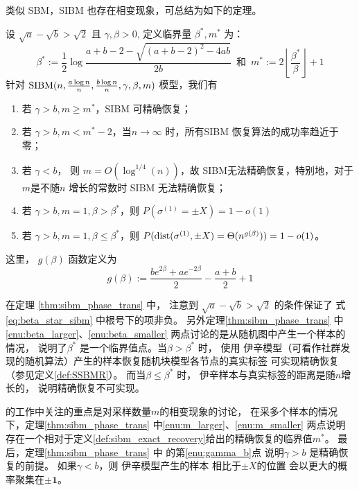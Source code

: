 类似 SBM，SIBM 也存在相变现象，可总结为如下的定理。
\begin{theorem}\label{thm:sibm_phase_trans}
  设 $\sqrt{a} - \sqrt{b} > \sqrt{2}$ 且 $\gamma, \beta > 0$,
  定义临界量 $\beta^*, m^*$ 为：
  \begin{equation}\label{eq:beta_star_sibm}
    \beta^* :=  \frac{1}{2} \log \frac{a+b-2 - \sqrt{(a+b-2)^2-4ab}}{2b}
    \, \textrm{ 和 } \,
    m^* := 2\left\lfloor\frac{\beta^*}{\beta} \right\rfloor + 1
  \end{equation}
  针对 $\operatorname{SIBM}(n, \frac{a \log n}{n}, \frac{b \log n}{n}, \gamma, \beta, m)$ 模型，我们有
  \begin{enumerate}
    \item\label{enu:m_larger} 若 $\gamma > b, m \geq m^*$，SIBM 可精确恢复；
    \item\label{enu:m_smaller} 若 $\gamma >b, m < m^*-2$，当$n\to \infty$ 时，所有SIBM 恢复算法的成功率趋近于零；
    \item\label{enu:gamma_b} 若 $ \gamma < b$， 则 $ m = O(\log^{1/4}(n))$，故 SIBM无法精确恢复，特别地，对于$m$是不随$n$
    增长的常数时 SIBM 无法精确恢复；
    \item\label{enu:beta_larger}  若 $\gamma>b, m=1, \beta > \beta^*$，则 $P(\sigma^{(1)}=\pm X) = 1-o(1)$
    \item\label{enu:beta_smaller}  若 $\gamma>b, m=1, \beta \leq \beta^*$，则
    $P(\operatorname{dist}(\sigma^{(1)}, \pm X) =
    \Theta(n^{g(\beta)}))=1-o(1)$。
  \end{enumerate}
  这里， $g(\beta)$ 函数定义为
  \begin{equation}
    g(\beta):= \frac{be^{2\beta} + a e^{-2\beta}}{2} - \frac{a+b}{2} +1
  \end{equation}
\end{theorem}
在定理 \ref{thm:sibm_phase_trans} 中，
注意到 $\sqrt{a} - \sqrt{b} > \sqrt{2}$ 的条件保证了
式\ref{eq:beta_star_sibm} 中根号下的项非负。
另外定理\ref{thm:sibm_phase_trans} 中\ref{enu:beta_larger}、\ref{enu:beta_smaller}
两点讨论的是从随机图中产生一个样本的情况，
说明了$\beta^*$ 是一个临界值点。当$\beta>\beta^*$ 时，
使用 伊辛模型（可看作社群发现的随机算法）产生的样本恢复随机块模型各节点的真实标签
可实现精确恢复（参见定义\ref{def:SSBMR}）。
而当$\beta\leq \beta^*$ 时， 伊辛样本与真实标签的距离是随$n$增长的，
说明精确恢复不可实现。

\citet{ye2020exact} 的工作中关注的重点是对采样数量$m$的相变现象的讨论，
在采多个样本的情况下，定理\ref{thm:sibm_phase_trans} 中\ref{enu:m_larger}、\ref{enu:m_smaller}
两点说明存在一个相对于定义\ref{def:sibm_exact_recovery}给出的精确恢复的临界值$m^*$。
最后，定理\ref{thm:sibm_phase_trans} 中
的第\ref{enu:gamma_b}点
说明$\gamma>b$
是精确恢复的前提。
如果$\gamma<b$，则
伊辛模型产生的样本
相比于$\pm X$的位置
会以更大的概率聚集在$\pm \bm{1}$。
